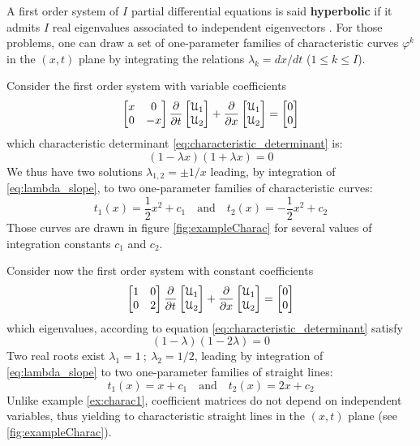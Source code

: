 \begin{definition}
  \label{def:hyperbolic_system}
  A first order system of $I$ partial differential equations is said \textbf{hyperbolic} if it admits $I$ real eigenvalues associated to independent eigenvectors \cite{Courant}.
For those problems, one can draw a set of one-parameter families of characteristic curves $\varphi^k$ in the $(x,t)$ plane by integrating the relations $\lambda_k=dx/dt$ ($1 \leq k \leq I$).
\end{definition}

\begin{example}
  \label{ex:charac1}
  Consider the first order system with variable coefficients
\begin{equation*}
 \left[\begin{matrix}x &0 \\0 &-x\end{matrix}\right] \frac{\partial }{\partial t} \left[\begin{matrix}\mathcal{U}_1 \\ \mathcal{U}_2\end{matrix}\right] + \frac{\partial }{\partial x}\left[\begin{matrix}\mathcal{U}_1 \\ \mathcal{U}_2\end{matrix}\right] = \left[\begin{matrix}0 \\0\end{matrix}\right]
\end{equation*}
which characteristic determinant \eqref{eq:characteristic_determinant} is:
\begin{equation*}
  (1-\lambda x)(1+\lambda x)=0
\end{equation*}
We thus have two solutions $\lambda_{1,2}=\pm 1/x$ leading, by integration of \eqref{eq:lambda_slope}, to two one-parameter families of characteristic curves:
\begin{equation*}
  t_1(x)=\frac{1}{2}x^2+c_1  \quad \text{and} \quad t_2(x)=-\frac{1}{2}x^2+c_2 
\end{equation*}
Those curves are drawn in figure \ref{fig:exampleCharac} for several values of integration constants $c_1$ and $c_2$.
\end{example}
\begin{example}
  \label{ex:charac2}
  Consider now the first order system with constant coefficients
\begin{equation*}
 \left[\begin{matrix}1 &0 \\0 &2\end{matrix}\right] \frac{\partial }{\partial t} \left[\begin{matrix}\mathcal{U}_1 \\ \mathcal{U}_2\end{matrix}\right] + \frac{\partial }{\partial x}\left[\begin{matrix}\mathcal{U}_1 \\ \mathcal{U}_2\end{matrix}\right] = \left[\begin{matrix}0 \\0\end{matrix}\right]
\end{equation*}
which eigenvalues, according to equation \eqref{eq:characteristic_determinant} satisfy
\begin{equation*}
  (1 - \lambda )(1- 2\lambda)=0
\end{equation*}
Two real roots exist $\lambda_1=1 \: ; \: \lambda_2=1/2$, leading by integration of \eqref{eq:lambda_slope} to two one-parameter families of straight lines:
\begin{equation*}
  t_1(x)=x+c_1  \quad \text{and} \quad t_2(x)=2x+c_2 
\end{equation*}
Unlike example \ref{ex:charac1}, coefficient matrices do not depend on independent variables, thus yielding to characteristic straight lines in the $(x,t)$ plane (see \ref{fig:exampleCharac}).
\end{example}
